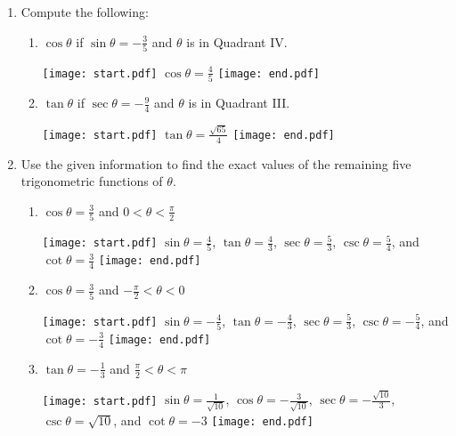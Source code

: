 \documentclass[12pt]{article}
\begin{document}
\begin{enumerate}
\begin{enumerate}
\end{enumerate}

\item Compute the following:

\begin{enumerate}

\item $\displaystyle \cos{\theta}$ if $\displaystyle \sin{\theta}=-\frac{3}{5}$ and $\theta$ is in Quadrant IV.

\texttt{[image: start.pdf]}
{$\displaystyle \cos{\theta}=\frac{4}{5}$}
\texttt{[image: end.pdf]}


\item $\displaystyle \tan{\theta}$ if $\displaystyle \sec{\theta}=-\frac{9}{4}$ and $\theta$ is in Quadrant III.

\texttt{[image: start.pdf]}
{$\displaystyle \tan{\theta}=\frac{\sqrt{65}}{4}$}
\texttt{[image: end.pdf]}


\end{enumerate}

\item Use the given information to find the exact values of the remaining five trigonometric functions of $\theta$.

\begin{enumerate}

\item $\displaystyle \cos{\theta}=\frac{3}{5}$ and $\displaystyle 0 < \theta < \frac{\pi}{2}$

\texttt{[image: start.pdf]}
{$\displaystyle \sin{\theta}=\frac{4}{5}$, $\displaystyle \tan{\theta}=\frac{4}{3}$, $\displaystyle \sec{\theta}=\frac{5}{3}$, $\displaystyle \csc{\theta}=\frac{5}{4}$, and $\displaystyle \cot{\theta}=\frac{3}{4}$}
\texttt{[image: end.pdf]}


\item $\displaystyle \cos{\theta}=\frac{3}{5}$ and $\displaystyle -\frac{\pi}{2} < \theta < 0$

\texttt{[image: start.pdf]}
{$\displaystyle \sin{\theta}=-\frac{4}{5}$, $\displaystyle \tan{\theta}=-\frac{4}{3}$, $\displaystyle \sec{\theta}=\frac{5}{3}$, $\displaystyle \csc{\theta}=-\frac{5}{4}$, and $\displaystyle \cot{\theta}=-\frac{3}{4}$}
\texttt{[image: end.pdf]}


\item $\displaystyle \tan{\theta}=-\frac{1}{3}$ and $\displaystyle \frac{\pi}{2} < \theta < \pi$

\texttt{[image: start.pdf]}
{$\displaystyle \sin{\theta}=\frac{1}{\sqrt{10}}$, $\displaystyle \cos{\theta}=-\frac{3}{\sqrt{10}}$, $\displaystyle \sec{\theta}=-\frac{\sqrt{10}}{3}$, $\displaystyle \csc{\theta}=\sqrt{10}$, and $\displaystyle \cot{\theta}=-3$}
\texttt{[image: end.pdf]}



\end{enumerate}
\end{enumerate}
\end{document}
